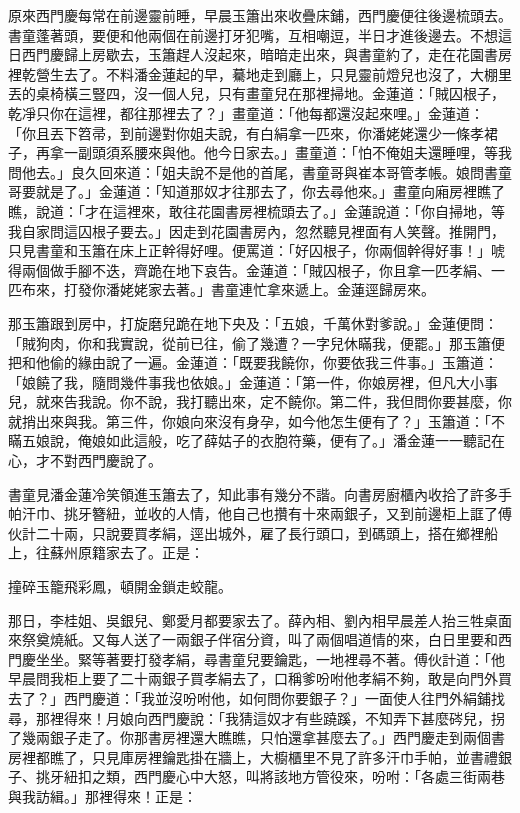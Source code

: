 原來西門慶每常在前邊靈前睡，早晨玉簫出來收疊床鋪，西門慶便往後邊梳頭去。書童蓬著頭，要便和他兩個在前邊打牙犯嘴，互相嘲逗，半日才進後邊去。不想這日西門慶歸上房歇去，玉簫趕人沒起來，暗暗走出來，與書童約了，走在花園書房裡乾營生去了。不料潘金蓮起的早，驀地走到廳上，只見靈前燈兒也沒了，大棚里丟的桌椅橫三豎四，沒一個人兒，只有畫童兒在那裡掃地。金蓮道：「賊囚根子，乾凈只你在這裡，都往那裡去了？」畫童道：「他每都還沒起來哩。」金蓮道： 「你且丟下笤帚，到前邊對你姐夫說，有白絹拿一匹來，你潘姥姥還少一條孝裙子，再拿一副頭須系腰來與他。他今日家去。」畫童道：「怕不俺姐夫還睡哩，等我問他去。」良久回來道：「姐夫說不是他的首尾，書童哥與崔本哥管孝帳。娘問書童哥要就是了。」金蓮道：「知道那奴才往那去了，你去尋他來。」畫童向廂房裡瞧了瞧，說道：「才在這裡來，敢往花園書房裡梳頭去了。」金蓮說道：「你自掃地，等我自家問這囚根子要去。」因走到花園書房內，忽然聽見裡面有人笑聲。推開門，只見書童和玉簫在床上正幹得好哩。便罵道：「好囚根子，你兩個幹得好事！」唬得兩個做手腳不迭，齊跪在地下哀告。金蓮道：「賊囚根子，你且拿一匹孝絹、一匹布來，打發你潘姥姥家去著。」書童連忙拿來遞上。金蓮逕歸房來。

那玉簫跟到房中，打旋磨兒跪在地下央及：「五娘，千萬休對爹說。」金蓮便問：「賊狗肉，你和我實說，從前已往，偷了幾遭？一字兒休瞞我，便罷。」那玉簫便把和他偷的緣由說了一遍。金蓮道：「既要我饒你，你要依我三件事。」玉簫道：「娘饒了我，隨問幾件事我也依娘。」金蓮道：「第一件，你娘房裡，但凡大小事兒，就來告我說。你不說，我打聽出來，定不饒你。第二件，我但問你要甚麼，你就捎出來與我。第三件，你娘向來沒有身孕，如今他怎生便有了？」玉簫道：「不瞞五娘說，俺娘如此這般，吃了薛姑子的衣胞符藥，便有了。」潘金蓮一一聽記在心，才不對西門慶說了。

書童見潘金蓮冷笑領進玉簫去了，知此事有幾分不諧。向書房廚櫃內收拾了許多手帕汗巾、挑牙簪紐，並收的人情，他自己也攢有十來兩銀子，又到前邊柜上誆了傅伙計二十兩，只說要買孝絹，逕出城外，雇了長行頭口，到碼頭上，搭在鄉裡船上，往蘇州原籍家去了。正是：

撞碎玉籠飛彩鳳，頓開金鎖走蛟龍。

那日，李桂姐、吳銀兒、鄭愛月都要家去了。薛內相、劉內相早晨差人抬三牲桌面來祭奠燒紙。又每人送了一兩銀子伴宿分資，叫了兩個唱道情的來，白日里要和西門慶坐坐。緊等著要打發孝絹，尋書童兒要鑰匙，一地裡尋不著。傅伙計道：「他早晨問我柜上要了二十兩銀子買孝絹去了，口稱爹吩咐他孝絹不夠，敢是向門外買去了？」西門慶道：「我並沒吩咐他，如何問你要銀子？」一面使人往門外絹鋪找尋，那裡得來！月娘向西門慶說：「我猜這奴才有些蹺蹊，不知弄下甚麼硶兒，拐了幾兩銀子走了。你那書房裡還大瞧瞧，只怕還拿甚麼去了。」西門慶走到兩個書房裡都瞧了，只見庫房裡鑰匙掛在牆上，大櫥櫃里不見了許多汗巾手帕，並書禮銀子、挑牙紐扣之類，西門慶心中大怒，叫將該地方管役來，吩咐：「各處三街兩巷與我訪緝。」那裡得來！正是：

